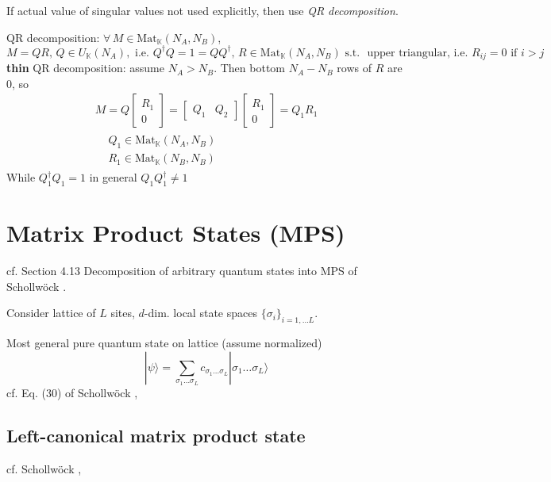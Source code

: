 \documentclass[10pt]{amsart}
\begin{document}
\begin{multicols*}{2}
If actual value of singular values not used explicitly, then use \emph{QR decomposition}.  

QR decomposition: $\forall \, M \in \text{Mat}_{\mathbb{K}}(N_A,N_B)$, 
\begin{equation}
M=QR, \, Q\in U_{\mathbb{K}}(N_A), \text{ i.e. } Q^{\dag}Q = 1=QQ^{\dag} , \, R \in \text{Mat}_{\mathbb{K}}(N_A,N_B) \text{ s.t. } \text{ upper triangular, i.e. } R_{ij}= 0 \text{ if } i >j 
\end{equation}
\textbf{thin} QR decomposition: assume $N_A>N_B$.  Then bottom $N_A-N_B$ rows of $R$ are $0$, so 
\[
\begin{gathered}
M=Q \left[ \begin{matrix} R_1 \\ 0 \end{matrix} \right] = \left[ \begin{matrix} Q_1 & Q_2 \end{matrix} \right] \left[ \begin{matrix} R_1 \\ 0 \end{matrix} \right] = Q_1R_1 \\
\begin{aligned}
& Q_1 \in \text{Mat}_{\mathbb{K}}(N_A,N_B) \\ 
& R_1 \in \text{Mat}_{\mathbb{K}}(N_B,N_B) 
\end{aligned}
\end{gathered}
\]
While $Q_1^{\dag}Q_1=1$ in general $Q_1 Q_1^{\dag} \neq 1$

\section{Matrix Product States (MPS)}

cf. Section 4.13 Decomposition of arbitrary quantum states into MPS of  Schollw\"{o}ck \cite{Scho2010}.  

Consider lattice of $L$ sites, $d$-dim. local state spaces $\lbrace \sigma_i \rbrace_{i=1,\dots L}$.  

Most general pure quantum state on lattice (assume normalized) 
\begin{equation}
|\psi \rangle = \sum_{\sigma_1 \dots \sigma_L} c_{\sigma_1 \dots \sigma_L }|\sigma_1 \dots \sigma_L \rangle
\end{equation}
cf. Eq. (30) of  Schollw\"{o}ck \cite{Scho2010},

\subsection{Left-canonical matrix product state}  
cf.  Schollw\"{o}ck \cite{Scho2010},


\end{multicols*}
\end{document}
